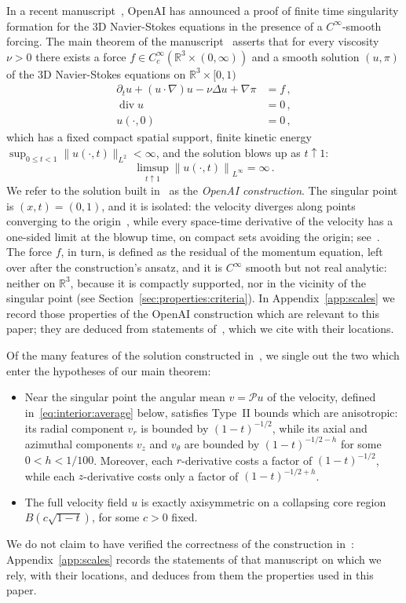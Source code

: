 \documentclass[11pt,reqno]{amsproc}
\numberwithin{equation}{section}
\theoremstyle{remark}
\newcommand{\p}{\partial}
\newcommand{\RR}{\mathbb R}
\newcommand{\norm}[1]{\left\|#1\right\|}
\renewcommand{\div}{\operatorname{div}}
\begin{document}
In a recent manuscript~\cite{OpenAIManuscript}, OpenAI has announced a proof of finite time singularity formation for the 3D Navier-Stokes equations in the presence of a $C^\infty$-smooth forcing. The main theorem of the manuscript~\cite[Theorem~1.1]{OpenAIManuscript} asserts that for every viscosity $\nu>0$ there exists a force $f\in C^\infty_c(\RR^3\times(0,\infty))$ and a smooth solution $(u,\pi)$ of the 3D Navier-Stokes equations on $\RR^3\times[0,1)$
\begin{align*}
 \p_tu+(u\cdot\nabla)u-\nu\Delta u+\nabla\pi&=f \,,\\
 \div u&=0 \,, \\
 u(\cdot,0)&=0 \,,
\end{align*}
which has a fixed compact spatial support, finite kinetic energy $\sup_{0\le t<1}\|u(\cdot,t)\|_{L^2}<\infty$, and the solution blows up as $t\uparrow 1$:
\[
\limsup_{t\uparrow1}\norm{u(\cdot,t)}_{L^\infty}=\infty
\,.
\]
We refer to the solution built in~\cite{OpenAIManuscript} as the \emph{OpenAI construction}. The singular point is $(x,t)=(0,1)$, and it is isolated: the velocity diverges along points converging to the origin~\cite[equations~(10.20)--(10.21)]{OpenAIManuscript}, while every space-time derivative of the velocity has a one-sided limit at the blowup time, on compact sets avoiding the origin; see~\cite[Theorem~3.1(ii), equation~(3.5), and the proof of Lemma~10.2]{OpenAIManuscript}. The force $f$, in turn, is defined as the residual of the momentum equation, left over after the construction's ansatz, and it is $C^\infty$ smooth but not real analytic: neither on $\RR^3$, because it is compactly supported, nor in the vicinity of the singular point (see Section~\ref{sec:properties:criteria}). In Appendix~\ref{app:scales} we record those properties of the OpenAI construction which are relevant to this paper; they are deduced from statements of~\cite{OpenAIManuscript}, which we cite with their locations.

Of the many features of the solution constructed in~\cite{OpenAIManuscript}, we single out the two which enter the hypotheses of our main theorem:
\begin{itemize}[leftmargin=2em]
\item[(i)] Near the singular point the angular mean $v=\mathcal Pu$ of the velocity, defined in~\eqref{eq:interior:average} below, satisfies Type~II bounds which are anisotropic: its radial component $v_r$ is bounded by $(1-t)^{-1/2}$, while its axial and azimuthal components $v_z$ and $v_\theta$ are bounded by $(1-t)^{-1/2-h}$ for some $0<h<1/100$. Moreover, each $r$-derivative costs a factor of $(1-t)^{-1/2}$, while each $z$-derivative costs only a factor of $(1-t)^{-1/2+h}$.
\item[(ii)] The full velocity field $u$ is exactly axisymmetric on a collapsing core region $B(c\sqrt{1-t})$, for some $c>0$ fixed.
\end{itemize}
We do not claim to have verified the correctness of the construction in~\cite{OpenAIManuscript}: Appendix~\ref{app:scales} records the statements of that manuscript on which we rely, with their locations, and deduces from them the properties used in this paper.
\end{document}
